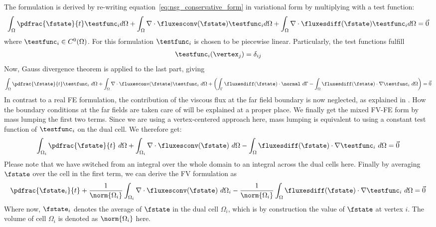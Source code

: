 \documentclass[../main.tex]{subfiles}
\begin{document}
The formulation is derived by re-writing equation~\ref{eq:nsg_conservative_form} in variational form by multiplying with a test function:
\begin{align}
\int_\Omega \pdfrac{\fstate}{t}\testfunc_i d\Omega +
\int_\Omega \nabla\cdot\fluxesconv(\fstate)\testfunc_i d\Omega +
 \int_{\Omega} \nabla\cdot\fluxesdiff(\fstate)\testfunc_i d\Omega = \vec{0}
\end{align}
where $\testfunc_i \in C^0(\Omega)$. For this formulation $\testfunc_i$ is chosen to be piecewise linear. Particularly, the test functions fulfill
\begin{align}
\testfunc_i(\vertex_j)=\delta_{ij}
\end{align}
Now, Gauss divergence theorem is applied to the last part, giving
\begin{align}
\int_\Omega \pdfrac{\fstate}{t}\testfunc_i ~d\Omega +
\int_\Omega \nabla\cdot\fluxesconv(\fstate)\testfunc_i ~d\Omega +
\left(
  \int_{\Gamma} \fluxesdiff(\fstate)\cdot\normal ~d\Gamma - \int_\Omega \fluxesdiff(\fstate)\cdot\nabla\testfunc_i ~d\Omega
\right)
=\vec{0}
\end{align}
In contrast to a real \ac{FE} formulation, the contribution of the viscous flux at the far field boundary is now neglected, as explained in \cite{Lakshminarayan2014}. How the boundary conditions at the far fields are taken care of will be explained at a proper place.
We finally get the mixed \ac{FV}-\ac{FE} form by mass lumping the first two terms. Since we are using a vertex-centered approach here, mass lumping is equivalent to using a constant test function of $\testfunc_i$ on the dual cell. We therefore get:
\begin{align}
\int_{\Omega_i} \pdfrac{\fstate}{t} ~d\Omega +
\int_{\Omega_i} \nabla\cdot\fluxesconv(\fstate) ~d\Omega -
\int_\Omega \fluxesdiff(\fstate)\cdot\nabla\testfunc_i ~d\Omega  =
\vec{0}
\end{align}
Please note that we have switched from an integral over the whole domain to an integral across the dual cells here.
Finally by averaging $\fstate$ over the cell in the first term, we can derive the \ac{FV} formulation as
\begin{align}
\pdfrac{\fstate_i}{t} +
\frac{1}{\norm{\Omega_i}} \int_{\Omega_i} \nabla\cdot\fluxesconv(\fstate) ~d\Omega_i -
\frac{1}{\norm{\Omega_i}} \int_\Omega \fluxesdiff(\fstate)\cdot\nabla\testfunc_i ~d\Omega  =
\vec{0}
\end{align}
Where now, $\fstate_i$ denotes the average of $\fstate$ in the dual cell $\Omega_i$, which is by construction the value of $\fstate$ at vertex $i$. The volume of cell $\Omega_i$ is denoted as $\norm{\Omega_i}$ here.
\end{document}
